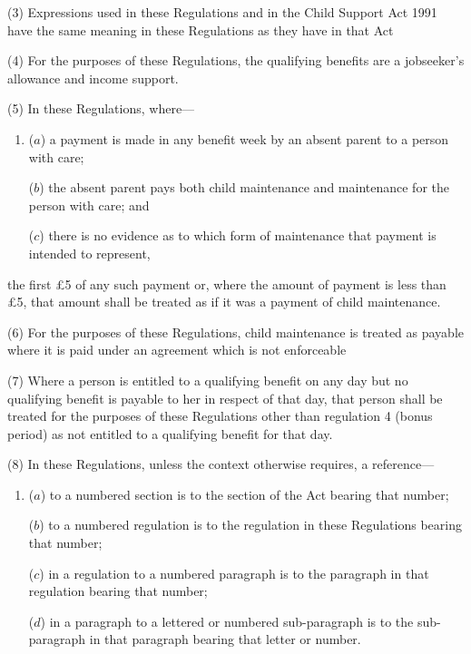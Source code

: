 \documentclass[12pt,a4paper]{article}
\begin{document}
(3) Expressions used in these Regulations and in the Child Support Act 1991 have the same meaning in these Regulations as they have in that Act

(4) For the purposes of these Regulations, the qualifying benefits are a jobseeker’s allowance and income support.

(5) In these Regulations, where—
\begin{enumerate}\item[]
($a$) a payment is made in any benefit week by an absent parent to a person with care;

($b$) the absent parent pays both child maintenance and maintenance for the person with care; and

($c$) there is no evidence as to which form of maintenance that payment is intended to represent,
\end{enumerate}
the first £5 of any such payment or, where the amount of payment is less than £5, that amount shall be treated as if it was a payment of child maintenance.

(6) For the purposes of these Regulations, child maintenance is treated as payable where it is paid under an agreement which is not enforceable

(7) Where a person is entitled to a qualifying benefit on any day but no qualifying benefit is payable to her in respect of that day, that person shall be treated for the purposes of these Regulations 
other than regulation 4 (bonus period)  %
as not entitled to a qualifying benefit for that day.

(8) In these Regulations, unless the context otherwise requires, a reference—
\begin{enumerate}\item[]
($a$) to a numbered section is to the section of the Act bearing that number;

($b$) to a numbered regulation is to the regulation in these Regulations bearing that number;

($c$) in a regulation to a numbered paragraph is to the paragraph in that regulation bearing that number;

($d$) in a paragraph to a lettered or numbered sub-paragraph is to the sub-paragraph in that paragraph bearing that letter or number.
\end{enumerate}
\end{document}
